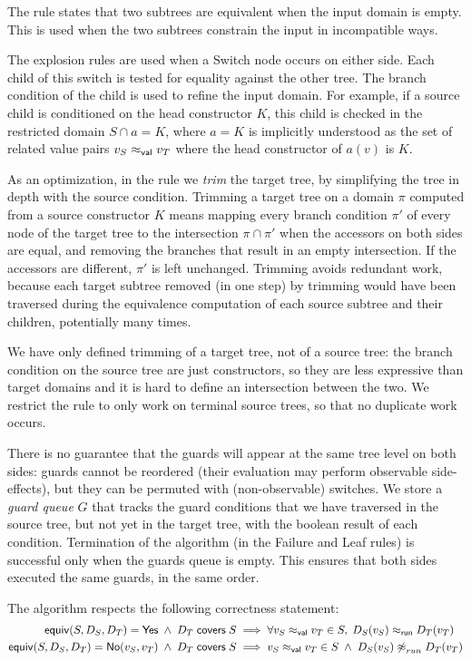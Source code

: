 \documentclass[12pt]{article}
\newcommand{\Rule}[1]{\LabTirName{#1}}
\begin{document}
The \Rule{empty} rule states that two subtrees are equivalent when the
input domain is empty. This is used when the two subtrees constrain
the input in incompatible ways.

The explosion rules are used when a \textsf{Switch} node occurs on
either side. Each child of this switch is tested for equality against
the other tree. The branch condition of the child is used to refine
the input domain. For example, if a source child is conditioned on the
head constructor $K$, this child is checked in the restricted domain
$S \cap a = K$, where $a = K$ is implicitly understood as the set of
related value pairs $\vrel {v_S} {v_T}$ where the head constructor of
$a(v)$ is $K$.

As an optimization, in the \Rule{explode-left} rule we \emph{trim} the
target tree, by simplifying the tree in depth with the source
condition. Trimming a target tree on a domain $\pi$ computed from
a source constructor $K$ means mapping every branch condition $\pi'$
of every node of the target tree to the intersection $\pi \cap \pi'$
when the accessors on both sides are equal, and removing the branches
that result in an empty intersection. If the accessors are different,
$\pi'$ is left unchanged.  Trimming avoids redundant work, because
each target subtree removed (in one step) by trimming would have been
traversed during the equivalence computation of each source subtree
and their children, potentially many times.

We have only defined trimming of a target tree, not of a source tree:
the branch condition on the source tree are just constructors, so they
are less expressive than target domains and it is hard to define an
intersection between the two. We restrict the \Rule{explode-right}
rule to only work on terminal source trees, so that no duplicate work
occurs.

There is no guarantee that the guards will appear at the same tree
level on both sides: guards cannot be reordered (their evaluation may
perform observable side-effects), but they can be permuted with
(non-observable) switches. We store a \emph{guard queue} $G$ that
tracks the guard conditions that we have traversed in the source tree,
but not yet in the target tree, with the boolean result of each
condition.
%
Termination of the algorithm (in the \textsf{Failure} and
\textsf{Leaf} rules) is successful only when the guards queue is
empty. This ensures that both sides executed the same guards, in the
same order.

The algorithm respects the following correctness statement:
\begin{align*}
 \SimpleEquiv S {D_S} {D_T} = \Yes \;\land\; \covers {D_T} S
 & \implies
 \forall {\vrel {v_S} {v_T}} \in S,\; \runrel {D_S(v_S)} {D_T(v_T)}
\\
 \SimpleEquiv S {D_S} {D_T} = \No {v_S} {v_T} \;\land\; \covers {D_T} S
 & \implies
 \vrel {v_S} {v_T} \in S \;\land\; {\nparamrel{run} {D_S(v_S)} {D_T(v_T)}}
\end{align*}
\end{document}
